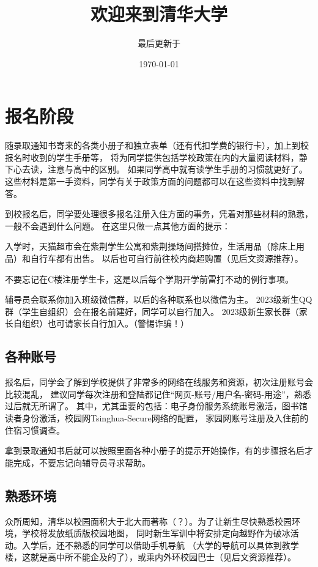 \documentclass{article}
\title{欢迎来到清华大学}
\author{最后更新于}
\date{\today}
\begin{document}
\maketitle

\section{报名阶段}
随录取通知书寄来的各类小册子和独立表单（还有代扣学费的银行卡），加上到校报名时收到的学生手册等，
将为同学提供包括学校政策在内的大量阅读材料，静下心去读，注意与高中的区别。
如果同学高中就有读学生手册的习惯就更好了。
这些材料是第一手资料，同学有关于政策方面的问题都可以在这些资料中找到解答。


到校报名后，同学要处理很多报名注册入住方面的事务，凭着对那些材料的熟悉，一般不会遇到什么问题。
在这里只做一点其他方面的提示：

{
\kaishu 入学时，天猫超市会在紫荆学生公寓和紫荆操场间搭摊位，生活用品（除床上用品）和自行车都有出售。
以后也可自行前往校内商超购置（见后文资源推荐）。

不要忘记在C楼注册学生卡，这是以后每个学期开学前雷打不动的例行事项。

辅导员会联系你加入班级微信群，以后的各种联系也以微信为主。
2023级新生QQ群（学生自组织）会在报名前建好，同学可以自行加入。
2023级新生家长群（家长自组织）也可请家长自行加入。（警惕诈骗！）
}

\subsection{各种账号}
报名后，同学会了解到学校提供了非常多的网络在线服务和资源，初次注册账号会比较混乱，
建议同学每次注册和登陆都记住“网页-账号/用户名-密码-用途”，熟悉过后就无所谓了。
其中，尤其重要的包括：电子身份服务系统账号激活，图书馆读者身份激活，校园网Tsinghua-Secure网络的配置，
家园网账号注册及入住前的住宿习惯调查。


拿到录取通知书后就可以按照里面各种小册子的提示开始操作，有的步骤报名后才能完成，不要忘记向辅导员寻求帮助。


\subsection{熟悉环境}
众所周知，清华以校园面积大于北大而著称（？）。为了让新生尽快熟悉校园环境，学校将发放纸质版校园地图，
同时新生军训中将安排定向越野作为破冰活动。入学后，还不熟悉的同学可以借助手机导航
（大学的导航可以具体到教学楼，这就是高中所不能企及的了），或乘内外环校园巴士（见后文资源推荐）。
\end{document}
